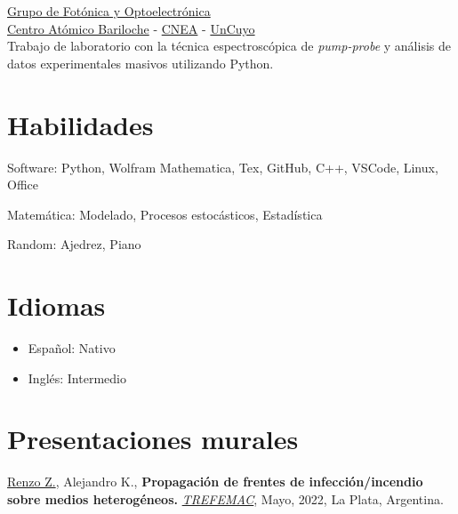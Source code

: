 \documentclass[a4paper,10pt]{article}
\begin{document}
\begin{adjustbox}{valign=t}
\begin{minipage}{0.5\textwidth}
\begin{description}
\href{https://fisica.cab.cnea.gov.ar/pop/}{\textcolor{ColorTwo}{Grupo de Fotónica y Optoelectrónica}} \\ 
\href{https://fisica.cab.cnea.gov.ar/}{\textcolor{ColorTwo}{Centro Atómico Bariloche}} 
\textcolor{ColorTwo}{-} \href{https://www.argentina.gob.ar/cnea}{\textcolor{ColorTwo}{CNEA}} \textcolor{ColorTwo}{-}
\href{https://www.uncuyo.edu.ar/}{\textcolor{ColorTwo}{UnCuyo}}\\
	
Trabajo de laboratorio con la técnica espectroscópica de \textit{pump-probe} y análisis de datos experimentales masivos utilizando Python.\;

\end{description}

\vspace*{-.6cm}
\section*{Habilidades}
\begin{description}
    \item Software: Python, Wolfram Mathematica, Tex, GitHub, C++, VSCode, Linux, Office
    \item Matemática: Modelado, Procesos estocásticos, Estadística
    \item Random: Ajedrez, Piano
\end{description}

\vspace*{-.6cm}
\section*{Idiomas}
\begin{itemize}
	\raggedright
	\item Español: Nativo
	\item Inglés: Intermedio
\end{itemize}

\vspace*{-.6cm}
\section*{Presentaciones murales}
\begin{description}
	\raggedright
	\item \underline{Renzo Z.}, Alejandro K., \textbf{Propagación de frentes de infección/incendio sobre medios heterogéneos.} 
    {\href{https://sites.google.com/view/trefemac2022}{\it TREFEMAC}}, Mayo, 2022, La Plata, Argentina. 


\end{description}
\end{minipage}
\end{adjustbox}
\end{document}
